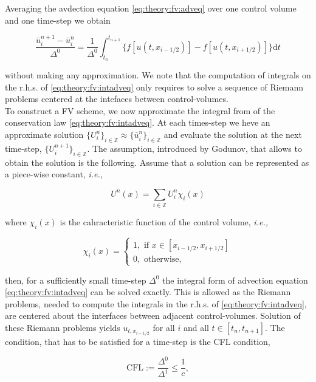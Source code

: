 \documentclass[11pt,a4paper,headinclude=true,DIV=14,BCOR=8mm,chapterprefix,listof=totoc,twoside,openright,abstracton]{scrbook}
\begin{document}
Averaging the avdection equation \ref{eq:theory:fv:adveq} over one control volume and one time-step we obtain

\begin{equation}
    \frac{\bar{u}_{i}^{n+1}-\bar{u}_{i}^{n}}{\Delta^0} = \frac{1}{\Delta^0}\int_{t_n}^{t_{n+1}}\big\{f[u(t,x_{i-1/2})] - f[u(t,x_{i+1/2})]\big\}\text{d}t
    \label{eq:theory:fv:intadveq}
\end{equation}

without making any approximation. We note that the computation of integrals on the r.h.s. of \ref{eq:theory:fv:intadveq} only requires to solve a sequence of Riemann problems centered at the intefaces between control-volumes.\\
To construct a FV scheme, we now approximate the integral from of the conservation law \ref{eq:theory:fv:intadveq}. At each times-step we heve an approximate solution $\{U_{i}^{n}\}_{i\in\mathbb{Z}} \approx \{\bar{u}_{i}^{n}\}_{i\in\mathbb{Z}}$ and evaluate the solution at the next time-step, $\{U_{i}^{n+1}\}_{i\in\mathbb{Z}}$. The assumption, introduced by Godunov, that allows to obtain the solution is the following. Assume that a solution can be represented as a piece-wise constant, \textit{i.e.,}

\begin{equation}
    U^n(x) = \sum_{i\in\mathbb{Z}}U_i ^n \chi_i (x)
\end{equation}

where $\chi_i(x)$ is the cahracteristic function of the control volume, \textit{i.e.,}

\begin{equation}
    \chi_i(x) = 
    \begin{cases}
    1, \text{ if } x\in[x_{i-1/2},x_{i+1/2}] \\
    0, \text{ otherwise, }
    \end{cases}
\end{equation}

then, for a sufficiently small time-step $\Delta^0$ the integral form of advection equation \ref{eq:theory:fv:intadveq} can be solved exactly. This is allowed as the Riemann problems, needed to compute the integrals in the r.h.s. of \ref{eq:theory:fv:intadveq}, are centered about the interfaces between adjacent control-volumes. Solution of these Riemann problems yields $u_{t, x_{i-1/2}}$ for all $i$ and all $t\in[t_n, t_{n+1}]$. The condition, that has to be satisfied for a time-step is the CFL condition, 

\begin{equation}
    \text{CFL}:=\frac{\Delta^0}{\Delta^1}\leq\frac{1}{c},
\end{equation}
\end{document}
